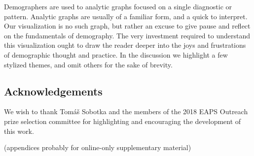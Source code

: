 \documentclass{article}
\begin{document}
Demographers are used to analytic graphs focused on a single diagnostic or pattern. Analytic graphs are usually of a familiar form, and a quick to interpret. Our visualization is no such graph, but rather an excuse to give pause and reflect on the fundamentals of demography. The very investment required to understand this visualization ought to draw the reader deeper into the joys and frustrations of demographic thought and practice. In the discussion we highlight a few stylized themes, and omit others for the sake of brevity. 

\subsection*{Acknowledgements} We wish to thank Tom\'a\v{s} Sobotka and the members of the 2018 EAPS Outreach prize selection committee for highlighting and encouraging the development of this work.

\FloatBarrier

\pagebreak
\begin{appendix}
(appendices probably for online-only supplementary material)

\end{appendix}
\pagebreak

\theendnotes
\pagebreak

\listoftables
\pagebreak

\listoffigures
\pagebreak

   
\end{document}
